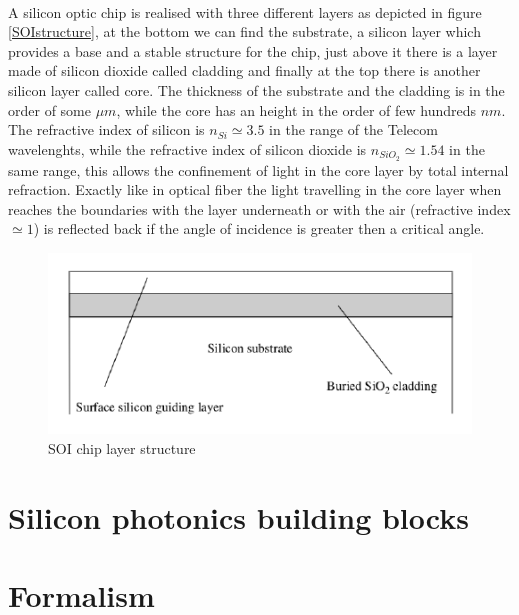 \documentclass[10pt]{book}
\begin{document}
\\
A silicon optic chip is realised with three different layers as depicted in figure \eqref{SOIstructure}, at the bottom we can find the substrate, a silicon layer which provides a base and a stable structure for the chip, just above it there is a layer made of silicon dioxide called cladding and finally at the top there is another silicon layer called core. The thickness of the substrate and the cladding is in the order of some $\mu m$, while the core has an height in the order of few hundreds $nm$. The refractive index of silicon is $n_{Si} \simeq 3.5$ in the range of the Telecom wavelenghts, while the refractive index of silicon dioxide is $n_{SiO_2}\simeq 1.54$ in the same range, this allows the confinement of light in the core layer by total internal refraction. Exactly like in optical fiber the light travelling in the core layer when reaches the boundaries with the layer underneath or with the air (refractive index $\simeq 1$) is reflected back if the angle of incidence is greater then a critical angle. 
\begin{figure}
\centering
\includegraphics[width = .7\textwidth]{img/SOIstructure}
\caption{SOI chip layer structure}
\label{SOIstructure}
\end{figure}
\chapter{Silicon photonics building blocks}

\chapter{Formalism}
\end{document}
